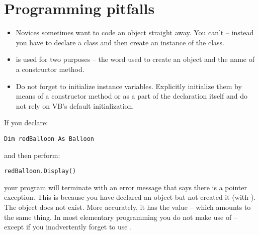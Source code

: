 	\section{Programming pitfalls}
		\begin{itemize}
      \item Novices sometimes want to code an object straight away. You can't – instead you have to declare a class and then create an instance of the class.
      \item {} is used for two purposes – the word used to create an object and the name of a constructor method.
      \item Do not forget to initialize instance variables. Explicitly initialize them by means of a constructor method or as a part of the declaration itself and do not rely on VB's default initialization.
		\end{itemize}
		If you declare:
		\begin{lstlisting}
Dim redBalloon As Balloon
		\end{lstlisting}
		and then perform:
		\begin{lstlisting}
redBalloon.Display()
		\end{lstlisting}
		your program will terminate with an error message that says there is a  pointer exception. This is because you have declared an object but not created it (with ). The object  does not exist. More accurately, it has the value  – which amounts to the same thing. In most elementary programming you do not make use of  – except if you inadvertently forget to use .


